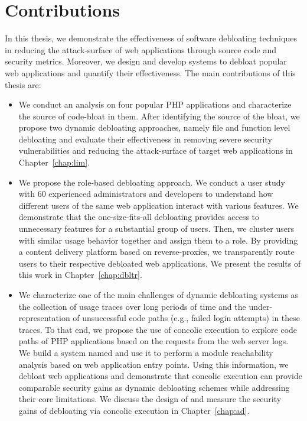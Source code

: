 \section{Contributions}

In this thesis, we demonstrate the effectiveness of software debloating techniques in reducing the attack-surface of web applications through source code and security metrics. 
Moreover, we design and develop systems to debloat popular web applications and quantify their effectiveness. The main contributions of this thesis are:

\begin{itemize}
    \item We conduct an analysis on four popular PHP applications and characterize the source of code-bloat in them. After identifying the source of the bloat, we propose two dynamic debloating approaches, namely file and function level debloating and evaluate their effectiveness in removing severe security vulnerabilities and reducing the attack-surface of target web applications in Chapter~\ref{chap:lim}.
    \item We propose the role-based debloating approach. We conduct a user study with 60 experienced administrators and developers to understand how different users of the same web application interact with various features. We demonstrate that the one-size-fits-all debloating provides access to unnecessary features for a substantial group of users. Then, we cluster users with similar usage behavior together and assign them to a role. By providing a content delivery platform based on reverse-proxies, we transparently route users to their respective debloated web applications. We present the results of this work in Chapter~\ref{chap:dbltr}. 
    \item We characterize one of the main challenges of dynamic debloating systems as the collection of usage traces over long periods of time and the under-representation of unsuccessful code paths (e.g., failed login attempts) in these traces. To that end, we propose the use of concolic execution to explore code paths of PHP applications based on the requests from the web server logs. We build a system named \animatedead{} and use it to perform a module reachability analysis based on web application entry points. Using this information, we debloat web applications and demonstrate that concolic execution can provide comparable security gains as dynamic debloating schemes while addressing their core limitations. We discuss the design of \animatedead{} and measure the security gains of debloating via concolic execution in Chapter~\ref{chap:ad}.
\end{itemize}